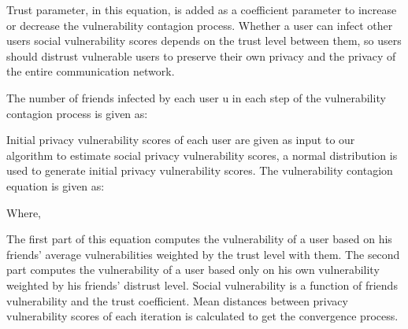 Trust parameter,
	in this equation,
	is added as a coefficient parameter to increase or decrease the vulnerability contagion process.
Whether a user can infect other users social vulnerability scores depends on the trust level between them,
	so users should distrust vulnerable users to preserve their own privacy and the privacy of the entire communication network.

The number of friends infected by each user u in each step of the vulnerability contagion process is given as:


Initial privacy vulnerability scores of each user are given as input to our algorithm to estimate social privacy vulnerability scores,
	a normal distribution is used to generate initial privacy vulnerability scores.
The vulnerability contagion equation is given as:


Where,

The first part of this equation computes the vulnerability of a user based on his friends' average vulnerabilities weighted by the trust level with them.
The second part computes the vulnerability of a user based only on his own vulnerability weighted by his friends' distrust level.
Social vulnerability is a function of friends vulnerability and the trust coefficient.
Mean distances between privacy vulnerability scores of each iteration is calculated to get the convergence process.%






